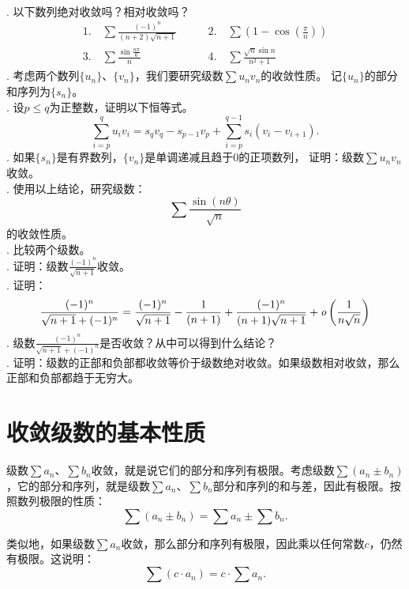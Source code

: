 \documentclass[12pt,UTF8]{ctexbook}
\begin{document}
\begin{xt}
    \mbox{} \\
    . 以下数列绝对收敛吗？相对收敛吗？\\
    $$
    \begin{array}{ll}
        1. \quad \sum \frac{(-1)^n}{(n + 2)\sqrt{n + 1}} \qquad &2. \quad \sum \left(1 - \cos{\left(\frac{\pi}{n}\right)}\right) \\
        3. \quad \sum \frac{\sin{\frac{n\pi}{6}}}{n} \qquad &4. \quad \sum \frac{\sqrt{n}\sin{n}}{n^2 + 1} 
    \end{array}
    $$ 
    . 考虑两个数列$\{u_n\}$、$\{v_n\}$，我们要研究级数$\sum u_n v_n$的收敛性质。
    记$\{u_n\}$的部分和序列为$\{s_n\}$。\\
    . 设$p \leqslant q$为正整数，证明以下恒等式。
    $$ \sum_{i=p}^q u_i v_i = s_q v_q - s_{p-1} v_p + \sum_{i=p}^{q-1} s_i (v_i - v_{i+1}). $$
    . 如果$\{s_n\}$是有界数列，$\{v_n\}$是单调递减且趋于$0$的正项数列，
    证明：级数$\sum u_n v_n$收敛。\\
    . 使用以上结论，研究级数：
    $$ \sum \frac{\sin{(n\theta)}}{\sqrt{n}}$$
    的收敛性质。\\
    . 比较两个级数。\\
    . 证明：级数$\frac{(-1)^n}{\sqrt{n + 1}}$收敛。\\
    . 证明：
    $$\frac{(-1)^n}{\sqrt{n + 1} + (-1)^n} = \frac{(-1)^n}{\sqrt{n + 1}} - \frac{1}{(n + 1)} + \frac{(-1)^n}{(n + 1)\sqrt{n + 1}} + \mathit{o}\left(\frac{1}{n\sqrt{n}}\right)$$
    . 级数$\frac{(-1)^n}{\sqrt{n + 1} + (-1)^n}$是否收敛？从中可以得到什么结论？\\
    . 证明：级数的正部和负部都收敛等价于级数绝对收敛。如果级数相对收敛，那么正部和负部都趋于无穷大。
    
\end{xt}

\section{收敛级数的基本性质}

级数$\sum a_n$、$\sum b_n$收敛，就是说它们的部分和序列有极限。考虑级数$\sum (a_n \pm b_n)$，它的部分和序列，就是级数$\sum a_n$、$\sum b_n$部分和序列的和与差，因此有极限。按照数列极限的性质：
$$\sum (a_n \pm b_n) = \sum a_n \pm \sum b_n.$$

类似地，如果级数$\sum a_n$收敛，那么部分和序列有极限，因此乘以任何常数$c$，仍然有极限。这说明：
$$\sum (c \cdot a_n) = c\cdot \sum a_n.$$
\end{document}
